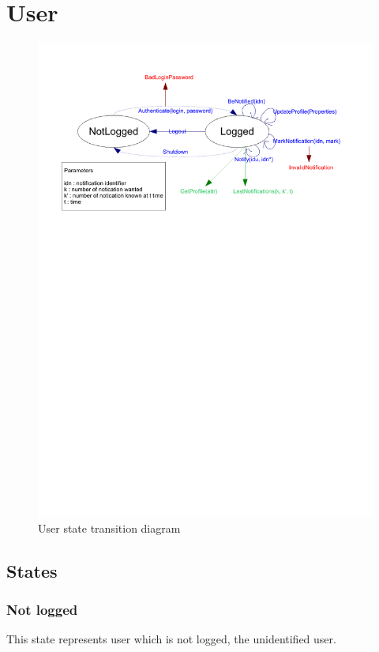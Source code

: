 \section{User}
	\begin{figure}[ht]
			\begin{center}
				\includegraphics[width=\textwidth,  trim=2cm 18cm 2cm 1cm]{UML_figure/state_transition/dojo_logic/st_user.pdf}
				\caption{User state transition diagram}
			\end{center}
	\end{figure}
	\subsection{States}
		\subsubsection{Not logged}
			This state represents user which is not logged, the unidentified user.
